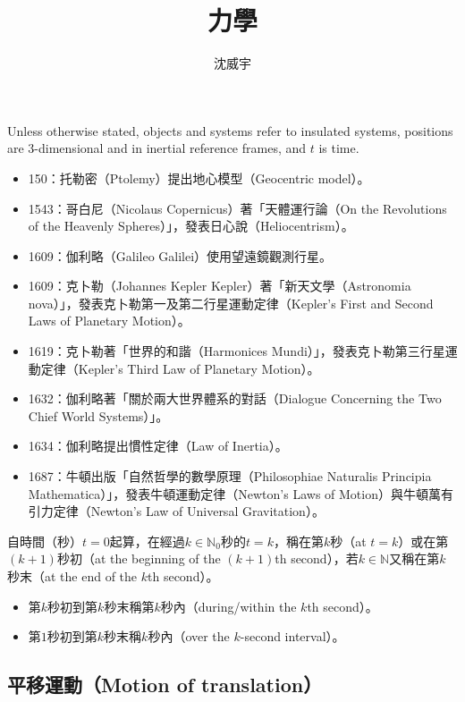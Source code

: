\documentclass[a4paper,12pt]{article}
\begin{document}
\title{力學}
\author{沈威宇}
\date{\temtoday}
\titletocdoc
{}
Unless otherwise stated, objects and systems refer to insulated systems, positions are 3-dimensional and in inertial reference frames, and $t$ is time.
\begin{itemize}
\item 150：托勒密（Ptolemy）提出地心模型（Geocentric model）。
\item 1543：哥白尼（Nicolaus Copernicus）著「天體運行論（On the Revolutions of the Heavenly Spheres）」，發表日心說（Heliocentrism）。
\item 1609：伽利略（Galileo Galilei）使用望遠鏡觀測行星。
\item 1609：克卜勒（Johannes Kepler Kepler）著「新天文學（Astronomia nova）」，發表克卜勒第一及第二行星運動定律（Kepler's First and Second Laws of Planetary Motion）。
\item 1619：克卜勒著「世界的和諧（Harmonices Mundi）」，發表克卜勒第三行星運動定律（Kepler's Third Law of Planetary Motion）。
\item 1632：伽利略著「關於兩大世界體系的對話（Dialogue Concerning the Two Chief World Systems）」。
\item 1634：伽利略提出慣性定律（Law of Inertia）。
\item 1687：牛頓出版「自然哲學的數學原理（Philosophiae Naturalis Principia Mathematica）」，發表牛頓運動定律（Newton's Laws of Motion）與牛頓萬有引力定律（Newton's Law of Universal Gravitation）。
\end{itemize}
自時間（秒）$t=0$起算，在經過$k\in\mathbb{N}_0$秒的$t=k$，稱在第$k$秒（at $t=k$）或在第$(k+1)$秒初（at the beginning of the $(k+1)$th second），若$k\in\mathbb{N}$又稱在第$k$秒末（at the end of the $k$th second）。
\begin{itemize}
\item 第$k$秒初到第$k$秒末稱第$k$秒內（during/within the $k$th second）。
\item 第$1$秒初到第$k$秒末稱$k$秒內（over the $k$-second interval）。
\end{itemize}
\subsection{平移運動（Motion of translation）}
\end{document}
